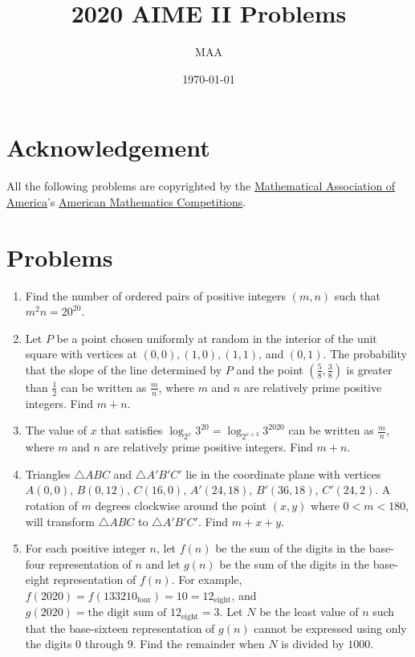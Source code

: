 \documentclass{article}%
\title{2020 AIME II Problems}%
\author{MAA}%
\date{\today}%
\begin{document}
%
\normalsize%
\maketitle%
\section{Acknowledgement}%
\label{sec:Acknowledgement}%
All the following problems are copyrighted by the \href{https://www.maa.org/}{Mathematical Association of America}'s \href{https://www.maa.org/math-competitions}{American Mathematics Competitions}.

%
\section{Problems}%
\label{sec:Problems}%
\begin{enumerate}%
\item%
[\textbf{Problem 1}]Find the number of ordered pairs of positive integers $(m,n)$ such that ${m^2n = 20 ^{20}}$.
%
\item%
[\textbf{Problem 2}]Let $P$ be a point chosen uniformly at random in the interior of the unit square with vertices at $(0,0), (1,0), (1,1)$, and $(0,1)$. The probability that the slope of the line determined by $P$ and the point $\left(\frac58, \frac38 \right)$ is greater than $\frac12$ can be written as $\frac{m}{n}$, where $m$ and $n$ are relatively prime positive integers. Find $m+n$.
%
\item%
[\textbf{Problem 3}]The value of $x$ that satisfies $\log_{2^x} 3^{20} = \log_{2^{x+3}} 3^{2020}$ can be written as $\frac{m}{n}$, where $m$ and $n$ are relatively prime positive integers. Find $m+n$.
%
\item%
[\textbf{Problem 4}]Triangles $\triangle ABC$ and $\triangle A'B'C'$ lie in the coordinate plane with vertices $A(0,0)$, $B(0,12)$, $C(16,0)$, $A'(24,18)$, $B'(36,18)$, $C'(24,2)$. A rotation of $m$ degrees clockwise around the point $(x,y)$ where $0<m<180$, will transform $\triangle ABC$ to $\triangle A'B'C'$. Find $m+x+y$.
%
\item%
[\textbf{Problem 5}]For each positive integer $n$, let $f(n)$ be the sum of the digits in the base-four representation of $n$ and let $g(n)$ be the sum of the digits in the base-eight representation of $f(n)$. For example, $f(2020) = f(133210_{\text{four}}) = 10 = 12_{\text{eight}}$, and $g(2020) = \text{the digit sum of }12_{\text{eight}} = 3$. Let $N$ be the least value of $n$ such that the base-sixteen representation of $g(n)$ cannot be expressed using only the digits $0$ through $9$. Find the remainder when $N$ is divided by $1000$.

\end{enumerate}
\end{document}
